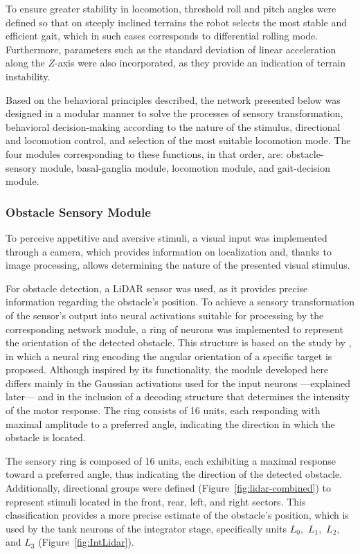\documentclass[preprint,12pt]{elsarticle}
\begin{document}
To ensure greater stability in locomotion, threshold roll and pitch angles were defined so that on steeply inclined terrains the robot selects the most stable and efficient gait, which in such cases corresponds to differential rolling mode. Furthermore, parameters such as the standard deviation of linear acceleration along the $Z$-axis were also incorporated, as they provide an indication of terrain instability.  

Based on the behavioral principles described, the network presented below was designed in a modular manner to solve the processes of sensory transformation, behavioral decision-making according to the nature of the stimulus, directional and locomotion control, and selection of the most suitable locomotion mode. The four modules corresponding to these functions, in that order, are: obstacle-sensory module, basal-ganglia module, locomotion module, and gait-decision module. 

\subsubsection{Obstacle Sensory Module}

To perceive appetitive and aversive stimuli, a visual input was implemented through a camera, which provides information on localization and, thanks to image processing, allows determining the nature of the presented visual stimulus. 

For obstacle detection, a LiDAR sensor was used, as it provides precise information regarding the obstacle’s position. To achieve a sensory transformation of the sensor’s output into neural activations suitable for processing by the corresponding network module, a ring of neurons was implemented to represent the orientation of the detected obstacle. This structure is based on the study by \citet{pardo2022bio}, in which a neural ring encoding the angular orientation of a specific target is proposed. Although inspired by its functionality, the module developed here differs mainly in the Gaussian activations used for the input neurons ---explained later--- and in the inclusion of a decoding structure that determines the intensity of the motor response. The ring consists of 16 units, each responding with maximal amplitude to a preferred angle, indicating the direction in which the obstacle is located.

The sensory ring is composed of 16 units, each exhibiting a maximal response toward a preferred angle, thus indicating the direction of the detected obstacle. Additionally, directional groups were defined (Figure~\ref{fig:lidar-combined}) to represent stimuli located in the front, rear, left, and right sectors. This classification provides a more precise estimate of the obstacle's position, which is used by the tank neurons of the integrator stage, specifically units $L_0,$ $L_1,$ $L_2,$ and $L_3$ (Figure~\ref{fig:IntLidar}). 
\end{document}
